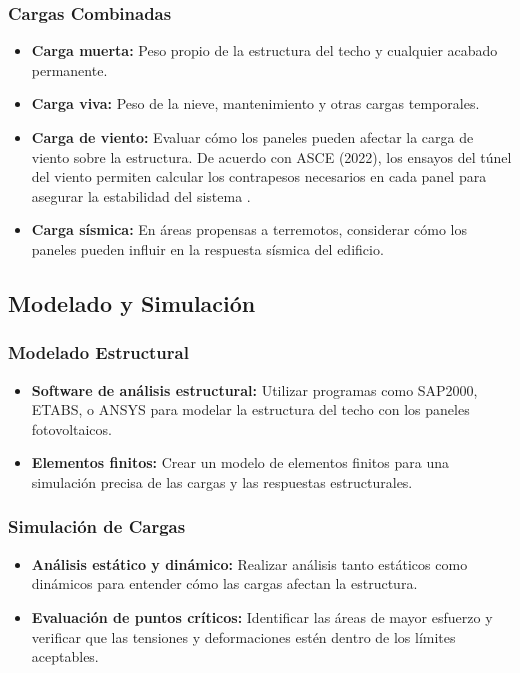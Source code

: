 \documentclass[a4paper,12pt]{article}
\begin{document}
\begin{Form}
\subsubsection*{Cargas Combinadas}
\begin{itemize}
    \item \textbf{Carga muerta:} Peso propio de la estructura del techo y cualquier acabado permanente.
    \item \textbf{Carga viva:} Peso de la nieve, mantenimiento y otras cargas temporales.
    \item \textbf{Carga de viento:} Evaluar cómo los paneles pueden afectar la carga de viento sobre la estructura. De acuerdo con ASCE (2022), los ensayos del túnel del viento permiten calcular los contrapesos necesarios en cada panel para asegurar la estabilidad del sistema \cite{idaepctcon}.
    \item \textbf{Carga sísmica:} En áreas propensas a terremotos, considerar cómo los paneles pueden influir en la respuesta sísmica del edificio.
\end{itemize}

\subsection*{Modelado y Simulación}

\subsubsection*{Modelado Estructural}
\begin{itemize}
    \item \textbf{Software de análisis estructural:} Utilizar programas como SAP2000, ETABS, o ANSYS para modelar la estructura del techo con los paneles fotovoltaicos.
    \item \textbf{Elementos finitos:} Crear un modelo de elementos finitos para una simulación precisa de las cargas y las respuestas estructurales.
\end{itemize}

\subsubsection*{Simulación de Cargas}
\begin{itemize}
    \item \textbf{Análisis estático y dinámico:} Realizar análisis tanto estáticos como dinámicos para entender cómo las cargas afectan la estructura.
    \item \textbf{Evaluación de puntos críticos:} Identificar las áreas de mayor esfuerzo y verificar que las tensiones y deformaciones estén dentro de los límites aceptables.
\end{itemize}


\end{Form}
\end{document}
